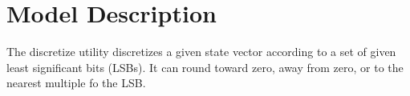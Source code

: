 \section{Model Description}

The discretize utility discretizes a given state vector according to a set of given least significant bits (LSBs). It can round toward zero, away from zero, or to the nearest multiple fo the LSB.
